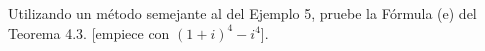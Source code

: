 \item Utilizando un método semejante al del Ejemplo 5, pruebe la Fórmula (e) del Teorema 4.3. [empiece con $(1 + i)^4 - i^4$].
